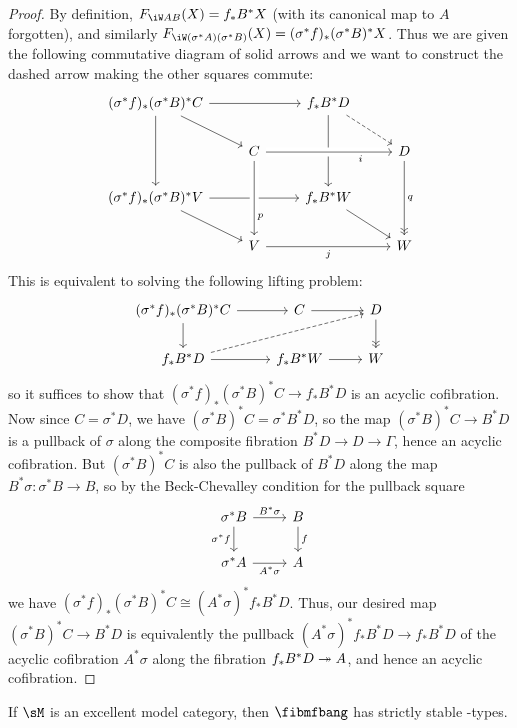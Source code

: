 \documentclass{amsart}
\let\W\iW
\begin{document}
\begin{proof}
  By definition, $F_{\W A B}(X) = f_* B^* X$ (with its canonical map to $A$ forgotten), and similarly $F_{\W (\sigma^*A) (\sigma^*B)}(X) = (\sigma^*f)_* (\sigma^*B)^* X$.
  Thus we are given the following commutative diagram of solid arrows and we want to construct the dashed arrow making the other squares commute:
  \[
  \begin{tikzcd}
    (\sigma^*f)_* (\sigma^*B)^* C \ar[rr] \ar[dr] \ar[dd] && f_* B^* D \ar[dr,dashed] \ar[dd]\\
    & C \ar[rr,->,near end,"i",swap,crossing over] && D \ar[dd,->>,"q"] \\
    (\sigma^*f)_* (\sigma^*B)^* V \ar[rr] \ar[dr] && f_* B^* W \ar[dr] \\
    & V \ar[rr,->,"j",swap] \ar[from=uu,crossing over,near end,"p"] && W
  \end{tikzcd}
  \]
  This is equivalent to solving the following lifting problem:
  \[
  \begin{tikzcd}
    (\sigma^*f)_* (\sigma^*B)^* C \ar[r] \ar[d] & C \ar[r] & D \ar[d,->>] \\
    f_* B^* D \ar[urr,dashed] \ar[r] & f_* B^* W \ar[r] & W
  \end{tikzcd}
  \]
  so it suffices to show that $(\sigma^*f)_* (\sigma^*B)^* C \to f_* B^* D$ is an acyclic cofibration.
  Now since $C = \sigma^*D$, we have $(\sigma^*B)^*C = \sigma^* B^* D$, so the map $(\sigma^*B)^*C \to B^* D$ is a pullback of $\sigma$ along the composite fibration $B^*D \to D \to \Gamma$, hence an acyclic cofibration.
  But $(\sigma^*B)^*C$ is also the pullback of $B^* D$ along the map $B^*\sigma : \sigma^*B \to B$, so by the Beck-Chevalley condition for the pullback square
  \[
  \begin{tikzcd}
    \sigma^* B \ar[r,"{B^*\sigma}"] \ar[d,"{\sigma^* f}",swap] & B \ar[d,"f"]\\
    \sigma^* A \ar[r,"{A^*\sigma}",swap] & A
  \end{tikzcd}
  \]
  we have $(\sigma^*f)_* (\sigma^*B)^* C \cong (A^*\sigma)^* f_* B^* D$.
  Thus, our desired map $(\sigma^*B)^*C \to B^* D$ is equivalently the pullback $(A^*\sigma)^* f_* B^* D \to f_* B^* D$ of the acyclic cofibration $A^*\sigma$ along the fibration $f_* B^* D \twoheadrightarrow A$, and hence an acyclic cofibration.
\end{proof}

\begin{cor}
  If $\sM$ is an excellent model category, then $\fibmfbang$ has strictly stable \W-types.
\end{cor}
\end{document}
